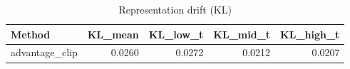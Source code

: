 \begin{table}[htbp]
\centering
\caption{Representation drift (KL)}
\label{tab:repr-drift}
\begin{tabular}{lrrrr}
\toprule
\textbf{Method} & \textbf{KL\_mean} & \textbf{KL\_low\_t} & \textbf{KL\_mid\_t} & \textbf{KL\_high\_t} \\
\midrule
advantage\_clip & 0.0260 & 0.0272 & 0.0212 & 0.0207 \\
\bottomrule
\end{tabular}
\end{table}